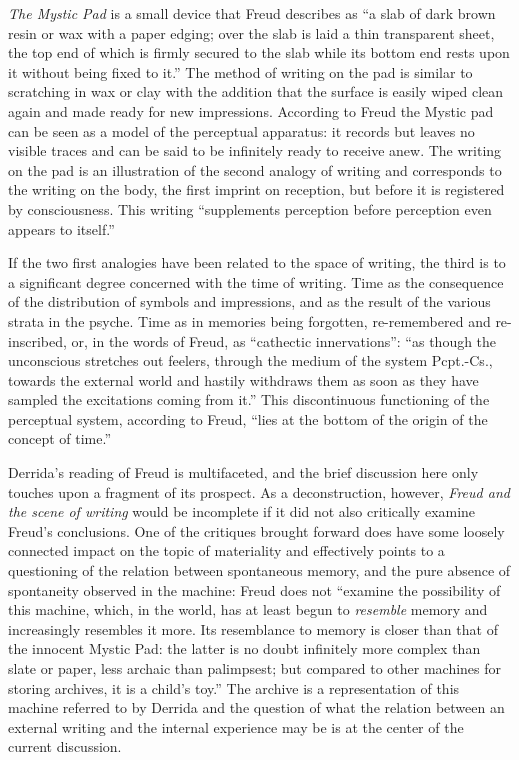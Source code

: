 \documentclass[11pt,a4paper]{article}
\begin{document}
\emph{The Mystic Pad} is a small device that Freud describes as ``a slab of dark brown resin or wax with a paper edging; over the slab is laid a thin transparent sheet, the top end of which is firmly secured to the slab while its bottom end rests upon it without being fixed to it.'' \parencite[p. 209]{freud1997} The method of writing on the pad is similar to scratching in wax or clay with the addition that the surface is easily wiped clean again and made ready for new impressions. According to Freud the Mystic pad can be seen as a model of the perceptual apparatus: it records but leaves no visible traces and can be said to be infinitely ready to receive anew. The writing on the pad is an illustration of the second analogy of writing and corresponds to the writing on the body, the first imprint on reception, but before it is registered by consciousness. This writing ``supplements perception before perception even appears to itself.'' \citep[p. 282]{der78}

If the two first analogies have been related to the space of writing, the third is to a significant degree concerned with the time of writing. Time as the consequence of the distribution of symbols and impressions, and as the result of the various strata in the psyche. Time as in memories being forgotten, re-remembered and re-inscribed, or, in the words of Freud, as ``cathectic innervations'': ``as though the unconscious stretches out feelers, through the medium of the system Pcpt.-Cs., towards the external world and hastily withdraws them as soon as they have sampled the excitations coming from it.'' \citep[][p. 211-2]{freud1997} This discontinuous functioning of the perceptual system, according to Freud, ``lies at the bottom of the origin of the concept of time.'' \citep[p. 212]{freud1997}

Derrida's reading of Freud is multifaceted, and the brief discussion here only touches upon a fragment of its prospect. As a deconstruction, however, \emph{Freud and the scene of writing} would be incomplete if it did not also critically examine Freud's conclusions. One of the critiques brought forward does have some loosely connected impact on the topic of materiality and effectively points to a questioning of the relation between spontaneous memory, and the pure absence of spontaneity observed in the machine: Freud does not ``examine the possibility of this machine, which, in the world, has at least begun to \emph{resemble} memory and increasingly resembles it more. Its resemblance to memory is closer than that of the innocent Mystic Pad: the latter is no doubt infinitely more complex than slate or paper, less archaic than palimpsest; but compared to other machines for storing archives, it is a child's toy.'' \citep[286-7]{der78} The archive is a representation of this machine referred to by Derrida and the question of what the relation between an external writing and the internal experience may be is at the center of the current discussion.
\end{document}
